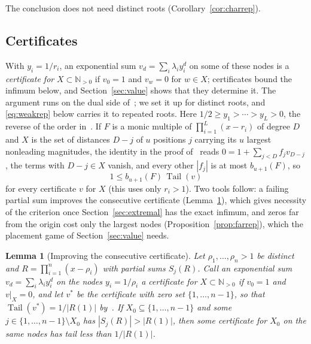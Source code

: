\documentclass[11pt]{article}
\newtheorem{lemma}[theorem]{Lemma}
\theoremstyle{definition}
\theoremstyle{plain}
\newcommand{\N}{\mathbb N}
\DeclareMathOperator{\Tail}{Tail}
\begin{document}
The conclusion does not need distinct roots (Corollary~\ref{cor:charrep}).

\subsection*{Certificates}

With $y_i=1/r_i$, an exponential sum $v_d=\sum_i\lambda_iy_i^d$ on some of
these nodes is a \emph{certificate for} $X\subset\N_{>0}$ if $v_0=1$ and
$v_w=0$ for $w\in X$; certificates bound the infimum below, and
Section~\ref{sec:value} shows that they determine it.  The argument runs
on the dual side of~\cite[Lemma~3.1]{coefficient-mass}; we set it up for distinct roots, and
\eqref{eq:weakrep} below carries it to repeated roots.  Here
$1/2\ge y_1>\cdots>y_L>0$, the reverse of the order in~\cite[Theorem~2.2]{coefficient-mass}.  If $F$ is a monic
multiple of $\prod_{i=1}^L(x-r_i)$ of degree $D$ and $X$ is the set of
distances $D-j$ of $u$ positions $j$ carrying its $u$ largest nonleading
magnitudes, the identity in the proof of~\cite[Lemma~3.1]{coefficient-mass} reads
$0=1+\sum_{j<D}f_jv_{D-j}$, the terms with $D-j\in X$ vanish, and every other
$|f_j|$ is at most $b_{u+1}(F)$, so
\begin{equation}\label{eq:weak}
  1\le b_{u+1}(F)\,\Tail(v)
\end{equation}
for every certificate $v$ for $X$ (this uses only $r_i>1$).  Two tools
follow: a failing partial sum improves the consecutive certificate
(Lemma~\ref{lem:improve}), which gives necessity of the criterion once
Section~\ref{sec:extremal} has the exact infimum, and zeros far from the
origin cost only the largest nodes (Proposition~\ref{prop:farrep}), which
the placement game of Section~\ref{sec:value} needs.

\begin{lemma}[Improving the consecutive certificate]\label{lem:improve}
Let $\rho_1,\ldots,\rho_n>1$ be distinct and $R=\prod_{i=1}^n(x-\rho_i)$ with
partial sums $S_j(R)$.  Call an exponential sum $v_d=\sum_i\lambda_iy_i^d$ on
the nodes $y_i=1/\rho_i$ a certificate for $X\subset\N_{>0}$ if $v_0=1$ and
$v|_X=0$, and let $v^*$ be the certificate with
zero set $\{1,\ldots,n-1\}$, so that $\Tail(v^*)=1/|R(1)|$ by~\cite[Lemma~2.1]{coefficient-mass}.  If
$X_0\subseteq\{1,\ldots,n-1\}$ and some $j\in\{1,\ldots,n-1\}\setminus X_0$
has $|S_j(R)|>|R(1)|$, then some certificate for $X_0$ on the same nodes has
tail less than $1/|R(1)|$.
\end{lemma}
\end{document}
